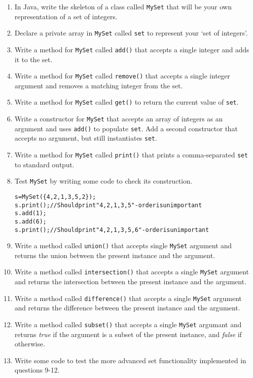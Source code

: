 \documentclass[11pt,a4paper]{report}
\begin{document}
\begin{enumerate}

    \item In Java, write the skeleton of a class called \texttt{MySet} that will be your own representation of a set of integers.

    \item Declare a private array in \texttt{MySet} called \texttt{set} to represent your `set of integers'.

    \item Write a method for \texttt{MySet} called \texttt{add()} that accepts a single integer and adds it to the set.

    \item Write a method for \texttt{MySet} called \texttt{remove()} that accepts a single integer argument and removes a matching integer from the set.

    \item Write a method for \texttt{MySet} called \texttt{get()} to return the current value of \texttt{set}.

    \item Write a constructor for \texttt{MySet} that accepts an array of integers as an argument and uses \texttt{add()} to populate \texttt{set}. Add a second constructor that accepts no argument, but still instantiates \texttt{set}.

    \item Write a method for \texttt{MySet} called \texttt{print()} that prints a comma-separated \texttt{set} to standard output.

    \item Test \texttt{MySet} by writing some code to check its construction.
\begin{alltt}
s = MySet(\{4, 2, 1, 3, 5, 2\});
s.print(); // Should print "4, 2, 1, 3, 5" - order is unimportant
s.add(1);
s.add(6);
s.print(); // Should print "4, 2, 1, 3, 5, 6" - order is unimportant
\end{alltt}
    
    \item Write a method called \texttt{union()} that accepts single \texttt{MySet} argument and returns the union between the present instance  and the argument.

    \item Write a method called \texttt{intersection()} that accepts a single \texttt{MySet} argument and returns the intersection between the present instance and the argument.

    \item Write a method called \texttt{difference()} that accepts a single \texttt{MySet} argument and returns the difference between the present instance and the argument.

    \item Write a method called \texttt{subset()} that accepts a single \texttt{MySet} argumant and returns \textit{true} if the argument is a subset of the present instance, and \textit{false} if otherwise.

    \item Write some code to test the more advanced set functionality implemented in questions 9-12.
\end{enumerate}
\end{document}
